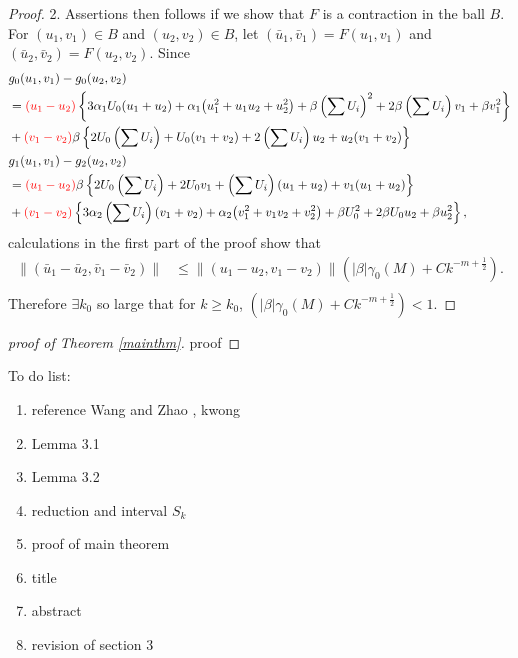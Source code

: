 \documentclass[a4paper,11pt]{article}
\def\red{\color{red}}
\def\red{\color{red}}
\newcommand{\tcr}{\textcolor{red}}
\theoremstyle{remark}
\begin{document}
\begin{proof}
2. Assertions then follows if we show that $F$ is a contraction in the ball $B$. For $(u_1,v_1)\in B$ and $(u_2,v_2) \in B$, let $(\bar{u}_1, \bar{v}_1) = F(u_1,v_1)$ and $(\bar{u}_2, \bar{v}_2) = F(u_2,v_2)$. Since
\begin{align*}
&g_0(u_1,v_1) - g_0(u_2,v_2)\\
&=\tcr{(u_1 - u_2)}\left\{ 3\alpha_1U_0(u_1+u_2) + \alpha_1\big(u_1^2+u_1u_2 + u_2^2\big) + \beta \left(\sum U_i\right)^2 + 2\beta \left(\sum U_i\right) v_1 + \beta v_1^2\right\}\\
&+ \tcr{(v_1-v_2)}\beta\left\{ 2U_0 \left(\sum U_i\right) + U_0(v_1+v_2) + 2\left( \sum U_i\right)u_2 + u_2(v_1+v_2)\right\} \\
&g_1(u_1,v_1) - g_2(u_2,v_2)\\
&=\tcr{(u_1 - u_2)}\beta\left\{ 2U_0\left(\sum U_i\right) + 2U_0v_1 + \left(\sum U_i\right)(u_1+u_2) +v_1(u_1+u_2)\right\}\\
&+ \tcr{(v_1-v_2)}\left\{ 3\alpha_2\left(\sum U_i\right)(v_1+v_2) + \alpha_2\big(v_1^2 + v_1v_2 + v_2^2\big) + \beta U_0^2 + 2\beta U_0u_2 + \beta u_2^2\right\},
\end{align*}
calculations in the first part of the proof show that
\begin{align*}
 \|(\bar{u}_1 - \bar{u}_2, \bar{v}_1 - \bar{v}_2)\| &\le \|(u_1 - u_2,v_1-v_2)\| \left( |\beta|\gamma_0(M) + Ck^{-m+ \frac{1}{2}}\right). \\
\end{align*}
Therefore $\exists k_0$ so large that for $k \ge k_0$, $\left( |\beta|\gamma_0(M) + Ck^{-m+ \frac{1}{2}}\right) < 1$.

\end{proof}
\begin{proof}[{\red proof of Theorem \ref{mainthm}}]
proof

\end{proof}
{\red
To do list:
\begin{enumerate}
 \item reference {Wang and Zhao \cite{wang_zhao_2017}}, kwong
 \item Lemma 3.1
 \item Lemma 3.2
 \item reduction and interval $S_k$
 \item proof of main theorem
 \item title
 \item abstract
 \item revision of section 3

\end{enumerate}
}
\end{document}

